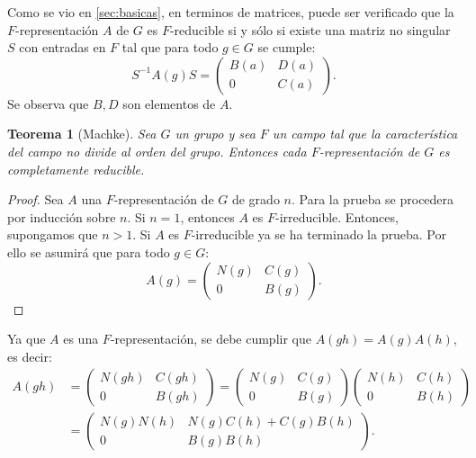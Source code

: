 \documentclass[12pt]{book}
\newtheorem{theorem}{Teorema}[section]
\theoremstyle{definition}
\newcounter{in}
\newcommand{\rep}{A}
\begin{document}
Como se vio en \ref{sec:basicas}, en terminos de matrices, puede ser
verificado que la $F$-representación $\rep$ de $G$ es
$F$-reducible si y sólo si existe una matriz no singular $S$ con
entradas en $F$ tal que para todo $g \in G$ se cumple:
\begin{equation*}
  S^{-1}\rep(g)S=
  \begin{pmatrix}
    B\left(a\right) & D\left(a\right) \\
    0 & C\left(a\right)
  \end{pmatrix}. 
\end{equation*}  
Se observa que $B, D$ son elementos de $\rep$.
\begin{theorem}[Machke]
  \label{tma}
  Sea $G$ un grupo y sea $F$ un campo tal que la característica del
  campo no divide al orden del grupo. Entonces cada $F$-representación
  de $G$ es completamente reducible.
\end{theorem}
\begin{proof}
  Sea $\rep$ una $F$-representación de $G$ de grado $n$. Para
  la prueba se procedera por inducción sobre $n$. Si $n=1$, entonces
  $\rep$ es $F$-irreducible. Entonces, supongamos que $n >
  1$. Si $\rep$ es $F$-irreducible ya se ha terminado la
  prueba. Por ello se asumirá que para todo $g \in G$:
  \begin{equation*}
  \rep(g)=
  \begin{pmatrix}
    N(g) & C(g) \\
    0 & B(g)
  \end{pmatrix}. 
\end{equation*}
\end{proof}
Ya que $\rep$ es una $F$-representación, se debe cumplir que
$\rep(gh) = \rep(g)\rep(h)$, es decir:
  \begin{equation}
    \label{eq:73}
    \begin{aligned}
  \rep(gh) &=
  \begin{pmatrix}
    N(gh) & C(gh) \\
    0 & B(gh)
  \end{pmatrix}
  =
    \begin{pmatrix}
    N(g) & C(g) \\
    0 & B(g)
  \end{pmatrix}
    \begin{pmatrix}
    N(h) & C(h) \\
    0 & B(h)
  \end{pmatrix} \\
  & =
    \begin{pmatrix}
    N(g)N(h) & N(g)C(h)+C(g)B(h) \\
    0 & B(g)B(h)
  \end{pmatrix}.
\end{aligned}
\end{equation}
\end{document}
